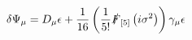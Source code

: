 \begin{equation}
\delta \Psi _{\mu }=D_{\mu }\epsilon +\frac{1}{16}\left( \frac{1}{5!}%
\slashed F_{[5]}\left( i\sigma ^{2}\right) \right) \gamma _{\mu }\epsilon
\end{equation}

